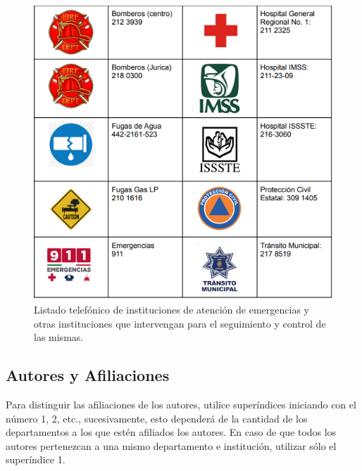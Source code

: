     \begin{figure}[H]
        \centering
        \includegraphics[scale=0.5]{35/Img/directorio.png}
        \caption{Listado telefónico de instituciones de atención de emergencias y otras instituciones que intervengan para el seguimiento y control de las mismas.}
    \end{figure}
    
    
    
    
    
    
    \subsection{Autores y Afiliaciones}
    
    Para distinguir las afiliaciones de los autores, utilice superíndices iniciando con el número 1, 2, etc., sucesivamente, esto dependerá de la cantidad de los departamentos a los que estén afiliados los autores. En caso de que todos los autores pertenezcan a una mismo departamento e institución, utilizar sólo el superíndice 1. 
    

